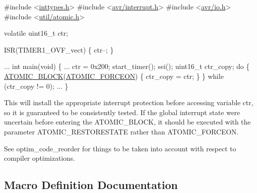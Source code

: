 \begin{DoxyCode}
\textcolor{preprocessor}{#include <\hyperlink{inttypes_8h}{inttypes.h}>}
\textcolor{preprocessor}{#include <\hyperlink{interrupt_8h}{avr/interrupt.h}>}
\textcolor{preprocessor}{#include <\hyperlink{io_8h}{avr/io.h}>}
\textcolor{preprocessor}{#include <\hyperlink{atomic_8h}{util/atomic.h}>}

\textcolor{keyword}{volatile} uint16\_t ctr;

ISR(TIMER1\_OVF\_vect)
\{
  ctr--;
\}

...
int
main(\textcolor{keywordtype}{void})
\{
   ...
   ctr = 0x200;
   start\_timer();
   sei();
   uint16\_t ctr\_copy;
   \textcolor{keywordflow}{do}
   \{
     \hyperlink{group__util__atomic_gaaaea265b31dabcfb3098bec7685c39e4}{ATOMIC\_BLOCK}(\hyperlink{group__util__atomic_ga92b11103b4b3b000a3190f0d26ba7062}{ATOMIC\_FORCEON})
     \{
       ctr\_copy = ctr;
     \}
   \}
   \textcolor{keywordflow}{while} (ctr\_copy != 0);
   ...
\}
\end{DoxyCode}


This will install the appropriate interrupt protection before accessing variable {\ttfamily ctr}, so it is guaranteed to be consistently tested. If the global interrupt state were uncertain before entering the A\+T\+O\+M\+I\+C\+\_\+\+B\+L\+O\+CK, it should be executed with the parameter A\+T\+O\+M\+I\+C\+\_\+\+R\+E\+S\+T\+O\+R\+E\+S\+T\+A\+TE rather than A\+T\+O\+M\+I\+C\+\_\+\+F\+O\+R\+C\+E\+ON.

See optim\+\_\+code\+\_\+reorder for things to be taken into account with respect to compiler optimizations. 

\subsection{Macro Definition Documentation}
